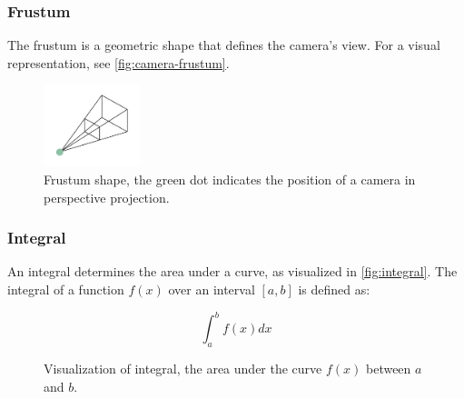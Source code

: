 \newpage
\subsubsection{Frustum}

The frustum is a geometric shape that defines the camera's view. For a visual representation, see \autoref{fig:camera-frustum}.

\begin{figure}[H]
  \centering
  \includegraphics[width=0.25\textwidth]{resources/camera-frustum.png}
  \caption{Frustum shape, the green dot indicates the position of a camera in perspective projection.}
  \label{fig:camera-frustum}
\end{figure}

\subsubsection{Integral}

An integral determines the area under a curve, as visualized in \autoref{fig:integral}. The integral of a function $f(x)$ over an interval $[a, b]$ is defined as:

\begin{equation}
  \label{eqn:integral}
  \int_{a}^{b} f(x) dx
\end{equation}

\begin{figure}[H]
  \centering
  \caption{Visualization of integral, the area under the curve $f(x)$ between $a$ and $b$.}
  \label{fig:integral}
\end{figure}

